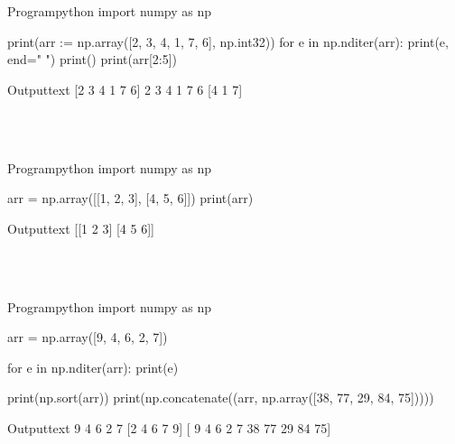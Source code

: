 \documentclass[11pt]{ipu-python}
\begin{document}
    \begin{code}
        {Program}{python}
import numpy as np

print(arr := np.array([2, 3, 4, 1, 7, 6], np.int32))
for e in np.nditer(arr):
    print(e, end=" ")
print()
print(arr[2:5])
    \end{code}
    \begin{code}
        {Output}{text}
[2 3 4 1 7 6]
2 3 4 1 7 6
[4 1 7]
    \end{code}

    \\~\\
    \begin{code}
        {Program}{python}
import numpy as np

arr = np.array([[1, 2, 3], [4, 5, 6]])
print(arr)
    \end{code}
    \begin{code}
        {Output}{text}
[[1 2 3]
 [4 5 6]]
    \end{code}

    \\~\\
    \begin{code}
        {Program}{python}
import numpy as np

arr = np.array([9, 4, 6, 2, 7])

for e in np.nditer(arr):
    print(e)

print(np.sort(arr))
print(np.concatenate((arr, np.array([38, 77, 29, 84, 75]))))
    \end{code}
    \begin{code}
        {Output}{text}
9
4
6
2
7
[2 4 6 7 9]
[ 9  4  6  2  7 38 77 29 84 75]
    \end{code}
\end{document}
